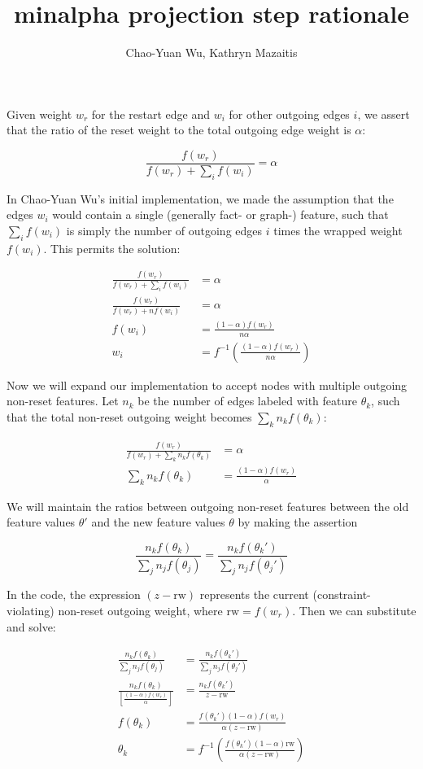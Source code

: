 \documentclass{article}
\title{minalpha projection step rationale}
\author{Chao-Yuan Wu, Kathryn Mazaitis}
\begin{document}
\maketitle

Given weight $w_r$ for the restart edge and $w_i$ for other outgoing edges $i$, we assert that the ratio of the reset weight to the total outgoing edge weight is $\alpha$:

$$\frac{f(w_r)}{f(w_r) + \sum\limits_i f(w_i)} = \alpha$$

In Chao-Yuan Wu's initial implementation, we made the assumption that the edges $w_i$ would contain a single (generally fact- or graph-) feature, such that $\sum\limits_i f(w_i)$ is simply the number of outgoing edges $i$ times the wrapped weight $f(w_i)$. This permits the solution:

\begin{align*}
\frac{f(w_r)}{f(w_r) + \sum\limits_i f(w_i)} & =   \alpha\\
\frac{f(w_r)}{f(w_r) + n f(w_i)} & =   \alpha\\
f(w_i) &= \frac{(1-\alpha)f(w_r)}{n \alpha}\\
w_i &= f^{-1}\left(\frac{(1-\alpha)f(w_r)}{n \alpha}\right)
\end{align*}

Now we will expand our implementation to accept nodes with multiple outgoing non-reset features. Let $n_k$ be the number of edges labeled with feature $\theta_k$, such that the total non-reset outgoing weight becomes $\sum\limits_k n_kf(\theta_k)$:

\begin{align*}
\frac{f(w_r)}{f(w_r) + \sum\limits_k n_kf(\theta_k)} &= \alpha\\
\sum\limits_k n_kf(\theta_k) &= \frac{(1-\alpha)f(w_r)}{\alpha}
\end{align*}

We will maintain the ratios between outgoing non-reset features between the old feature values $\theta'$ and the new feature values $\theta$ by making the assertion

$$\frac{n_kf(\theta_k)}{\sum\limits_j n_jf(\theta_j)} = \frac{n_kf(\theta_k')}{\sum\limits_j n_jf(\theta_j')}$$

In the code, the expression $(z-\mathrm{rw})$ represents the current (constraint-violating) non-reset outgoing weight, where $\mathrm{rw}=f(w_r)$. Then we can substitute and solve:

\begin{align*}
\frac{n_kf(\theta_k)}{\sum\limits_j n_jf(\theta_j)} &= \frac{n_kf(\theta_k')}{\sum\limits_j n_jf(\theta_j')}\\
\frac{n_kf(\theta_k)}{\left[\frac{(1-\alpha)f(w_r)}{\alpha}\right]} &= \frac{n_kf(\theta_k')}{z-\mathrm{rw}}\\
f(\theta_k) &= \frac{f(\theta_k')(1-\alpha)f(w_r)}{\alpha(z-\mathrm{rw})}\\
\theta_k &= f^{-1}\left(\frac{f(\theta_k')(1-\alpha)\mathrm{rw}}{\alpha(z-\mathrm{rw})}\right)
\end{align*}
\end{document}
